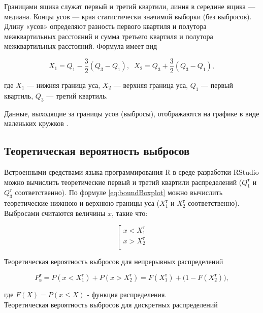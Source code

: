 Границами ящика служат первый и третий квартили, линия в середине ящика --- медиана. Концы усов --- края статистически значимой выборки (без выбросов). Длину «усов» определяют разность первого квартиля и полутора межквартильных расстояний и сумма третьего квартиля и полутора межквартильных расстояний. Формула имеет вид

\begin{equation} \label{eq:boundBoxplot}
    X_1 = Q_1 - \dfrac{3}{2}(Q_3 - Q_1), \;\; X_2 = Q_3 + \dfrac{3}{2}(Q_3 - Q_1),
\end{equation}

где $X_1$ --- нижняя граница уса, $X_2$ --- верхняя граница уса, $Q_1$ --- первый квартиль, $Q_3$ --- третий квартиль.

Данные, выходящие за границы усов (выбросы), отображаются на графике в виде маленьких кружков \cite{s:boxplot}.

\subsection{Теоретическая вероятность выбросов}

Встроенными средствами языка программирования R в среде разработки RStudio можно вычислить теоретические первый и третий квартили распределений ($Q_1^\text{т}$ и $Q_3^\text{т}$ соответственно). По формуле \eqref{eq:boundBoxplot} можно вычислить теоретические нижнюю и верхнюю границы уса ($X_1^\text{т}$ и $X_2^\text{т}$ соответственно). Выбросами считаются величины $x$, такие что:

\begin{equation}
    \left[ 
        \begin{gathered} 
            x < X_1^\text{т}\\ 
            x > X_2^\text{т}\\ 
        \end{gathered} 
    \right.
\end{equation}

Теоретическая вероятность выбросов для непрерывных распределений

\begin{equation} \label{eq:probTheorCont}
    P_\text{в}^\text{т} = P(x < X_1^\text{т}) + P(x > X_2^\text{т}) = F(X_1^\text{т}) + \Big(1 - F(X_2^\text{т})\Big),
\end{equation}

где $F(X) = P(x \le X)$ - функция распределения.\\
    
Теоретическая вероятность выбросов для дискретных распределений

